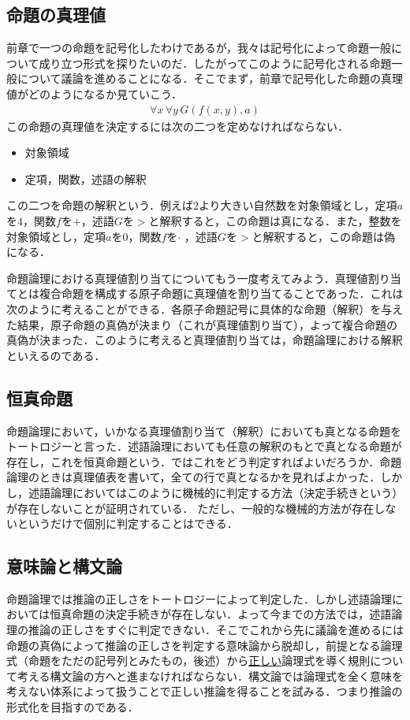\documentclass[10pt,b5paper,papersize,dvipdfmx]{jsbook}
\newcommand\fal[1]{\forall#1\,}
\begin{document}
\subsection{命題の真理値}
前章で一つの命題を記号化したわけであるが，我々は記号化によって命題一般について成り立つ形式を探りたいのだ．したがってこのように記号化される命題一般について議論を進めることになる．そこでまず，前章で記号化した命題の真理値がどのようになるか見ていこう．
\begin{align*}
  \fal{x} \fal{y} G(f(x,y),a)
\end{align*}
この命題の真理値を決定するには次の二つを定めなければならない．
\begin{itemize}
  \item 対象領域
  \item 定項，関数，述語の解釈
\end{itemize}
この二つを命題の解釈という．例えば$2$より大きい自然数を対象領域とし，定項$a$を$4$，関数$f$を$+$，述語$G$を$>$と解釈すると，この命題は真になる．また，整数を対象領域とし，定項$a$を$0$，関数$f$を$\cdot$\,\,，述語$G$を$>$と解釈すると，この命題は偽になる． \par
命題論理における真理値割り当てについてもう一度考えてみよう．真理値割り当てとは複合命題を構成する原子命題に真理値を割り当てることであった．これは次のように考えることができる．各原子命題記号に具体的な命題（解釈）を与えた結果，原子命題の真偽が決まり（これが真理値割り当て），よって複合命題の真偽が決まった．このように考えると真理値割り当ては，命題論理における解釈といえるのである．

\subsection{恒真命題}
命題論理において，いかなる真理値割り当て（解釈）においても真となる命題をトートロジーと言った．述語論理においても任意の解釈のもとで真となる命題が存在し，これを恒真命題という．ではこれをどう判定すればよいだろうか．命題論理のときは真理値表を書いて，全ての行で真となるかを見ればよかった．しかし，述語論理においてはこのように機械的に判定する方法（決定手続きという）が存在しないことが証明されている．
ただし、一般的な機械的方法が存在しないというだけで個別に判定することはできる．

\subsection{意味論と構文論}
命題論理では推論の正しさをトートロジーによって判定した．しかし述語論理においては恒真命題の決定手続きが存在しない．よって今までの方法では，述語論理の推論の正しさをすぐに判定できない．そこでこれから先に議論を進めるには命題の真偽によって推論の正しさを判定する意味論から脱却し，前提となる論理式（命題をただの記号列とみたもの，後述）から\underline{正しい}論理式を導く規則について考える構文論の方へと進まなければならない．構文論では論理式を全く意味を考えない体系によって扱うことで正しい推論を得ることを試みる．つまり推論の形式化を目指すのである．
\end{document}
